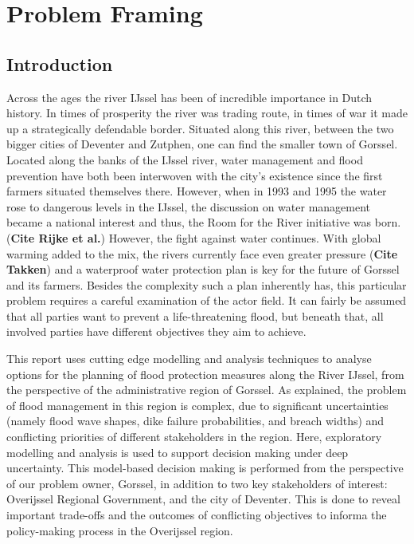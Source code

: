 \section{Problem Framing}
\label{s:prob_frame}
\subsection{Introduction}
Across the ages the river IJssel has been of incredible importance in Dutch history. In times of prosperity the river was trading route, in times of war it made up a strategically defendable border. Situated along this river, between the two bigger cities of Deventer and Zutphen, one can find the smaller town of Gorssel. Located along the banks of the IJssel river, water management and flood prevention have both been interwoven with the city's existence since the first farmers situated themselves there. However, when in 1993 and 1995 the water rose to dangerous levels in the IJssel, the discussion on water management became a national interest and thus, the Room for the River initiative was born. (\textbf{Cite Rijke et al.}) However, the fight against water continues. With global warming added to the mix, the rivers currently face even greater pressure (\textbf{Cite Takken}) and a waterproof water protection plan is key for the future of Gorssel and its farmers. Besides the complexity such a plan inherently has, this particular problem requires a careful examination of the actor field. It can fairly be assumed that all parties want to prevent a life-threatening flood, but beneath that, all involved parties have different objectives they aim to achieve. 

This report uses cutting edge modelling and analysis techniques to analyse options for the planning of flood protection measures along the River IJssel, from the perspective of the administrative region of Gorssel. As explained, the problem of flood management in this region is complex, due to significant uncertainties (namely flood wave shapes, dike failure probabilities, and breach widths) and conflicting priorities of different stakeholders in the region. Here, exploratory modelling and analysis is used to support decision making under deep uncertainty. This model-based decision making is performed from the perspective of our problem owner, Gorssel, in addition to two key stakeholders of interest: Overijssel Regional Government, and the city of Deventer. This is done to reveal important trade-offs and the outcomes of conflicting objectives to informa the policy-making process in the Overijssel region.


